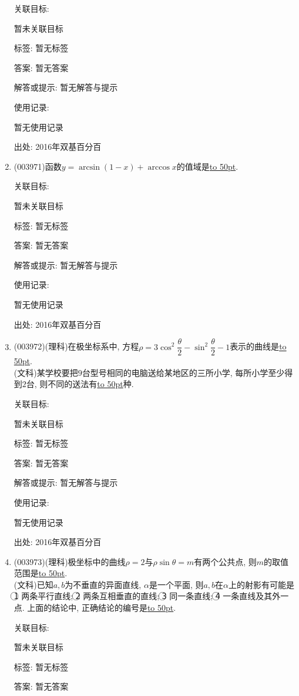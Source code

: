 \documentclass[10pt,a4paper]{article}
\newcommand{\blank}[1]{\underline{\hbox to #1pt{}}}
\begin{document}
\begin{enumerate}[1.]
关联目标:

暂未关联目标



标签: 暂无标签

答案: 暂无答案

解答或提示: 暂无解答与提示

使用记录:

暂无使用记录


出处: 2016年双基百分百
\item { (003971)}函数$y=\arcsin(1-x)+\arccos x$的值域是\blank{50}.


关联目标:

暂未关联目标



标签: 暂无标签

答案: 暂无答案

解答或提示: 暂无解答与提示

使用记录:

暂无使用记录


出处: 2016年双基百分百
\item { (003972)}(理科)在极坐标系中, 方程$\rho=3\cos^2\dfrac{\theta}{2}-\sin^2\dfrac{\theta}{2}-1$表示的曲线是\blank{50}.\\
(文科)某学校要把$9$台型号相同的电脑送给某地区的三所小学, 每所小学至少得到$2$台, 则不同的送法有\blank{50}种.


关联目标:

暂未关联目标



标签: 暂无标签

答案: 暂无答案

解答或提示: 暂无解答与提示

使用记录:

暂无使用记录


出处: 2016年双基百分百
\item { (003973)}(理科)极坐标中的曲线$\rho=2$与$\rho\sin\theta=m$有两个公共点, 则$m$的取值范围是\blank{50}.\\
(文科)已知$a,b$为不垂直的异面直线, $\alpha$是一个平面, 则$a,b$在$\alpha$上的射影有可能是
\textcircled{1} 两条平行直线; \textcircled{2} 两条互相垂直的直线; \textcircled{3} 同一条直线; \textcircled{4} 一条直线及其外一点.
上面的结论中, 正确结论的编号是\blank{50}.


关联目标:

暂未关联目标



标签: 暂无标签

答案: 暂无答案


\end{enumerate}
\end{document}
